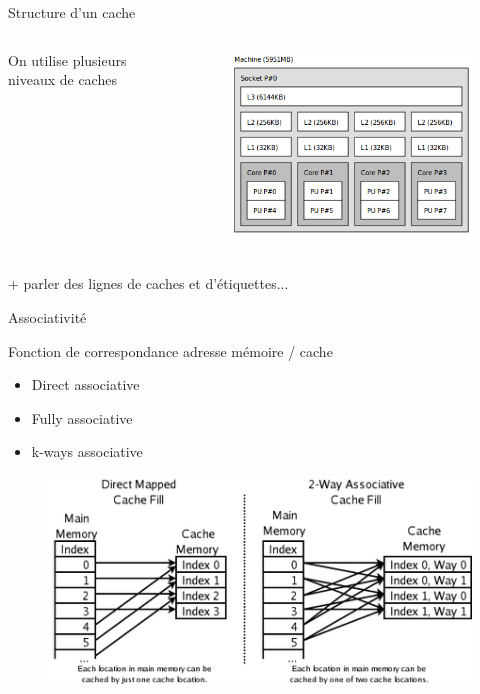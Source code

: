 \begin{frame}{Structure d'un cache}
	\begin{columns}[c]
		\begin{column}{.6\textwidth}
			On utilise plusieurs niveaux de caches
		\end{column}
		\begin{column}{.4\textwidth}
			\begin{figure}[h!]
				\includegraphics[scale=.3]{images/lstopo.png}
			\end{figure}
		\end{column}
	\end{columns}
	
	+ parler des lignes de caches et d'étiquettes...
\end{frame}	

\begin{frame}{Associativité}
	\begin{block}{Fonction de correspondance adresse mémoire / cache}
		\begin{itemize}
			\item{Direct associative}
			\item{Fully associative}
			\item{k-ways associative}
		\end{itemize}
	\end{block}
	\begin{figure}[h!]
		\includegraphics[scale=.33]{images/associative.png}
	\end{figure}
\end{frame}

